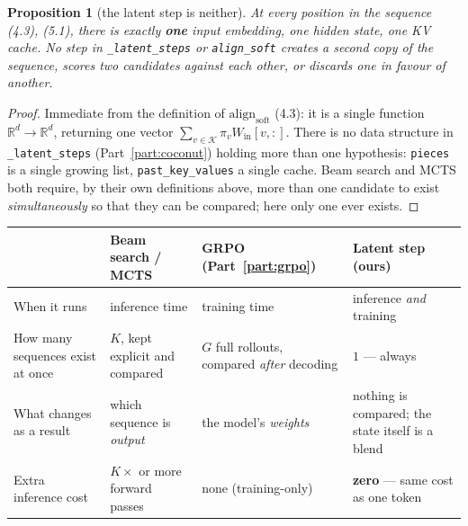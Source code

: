 \documentclass[11pt]{article}
\newtheorem{proposition}[theorem]{Proposition}
\theoremstyle{definition}
\begin{document}
\begin{proposition}[the latent step is neither]
\label{prop:not-beam}
At every position in the sequence (4.3), (5.1), there is exactly \textbf{one} input embedding, one hidden state, one KV cache. No step in \texttt{\_latent\_steps} or \texttt{align\_soft} creates a second copy of the sequence, scores two candidates against each other, or discards one in favour of another.
\end{proposition}
\begin{proof}
Immediate from the definition of $\mathrm{align}_{\mathrm{soft}}$ (4.3): it is a single function $\mathbb{R}^d\to\mathbb{R}^d$, returning one vector $\sum_{v\in\mathcal{K}}\pi_v W_{\mathrm{in}}[v,:]$. There is no data structure in \texttt{\_latent\_steps} (Part~\ref{part:coconut}) holding more than one hypothesis: \texttt{pieces} is a single growing list, \texttt{past\_key\_values} a single cache. Beam search and MCTS both require, by their own definitions above, more than one candidate to exist \emph{simultaneously} so that they can be compared; here only one ever exists.
\end{proof}

\begin{center}
\footnotesize
\begin{tabular}{@{}p{}p{}p{}p{}@{}}
\toprule
& \textbf{Beam search / MCTS} & \textbf{GRPO} (Part~\ref{part:grpo}) & \textbf{Latent step (ours)} \\
\midrule
When it runs & inference time & training time & inference \emph{and} training \\
How many sequences exist at once & $K$, kept explicit and compared & $G$ full rollouts, compared \emph{after} decoding & $1$ --- always \\
What changes as a result & which sequence is \emph{output} & the model's \emph{weights} & nothing is compared; the state itself is a blend \\
Extra inference cost & $K\times$ or more forward passes & none (training-only) & \textbf{zero} --- same cost as one token \\
\bottomrule
\end{tabular}
\end{center}

\begin{center}
\end{center}
\end{document}
